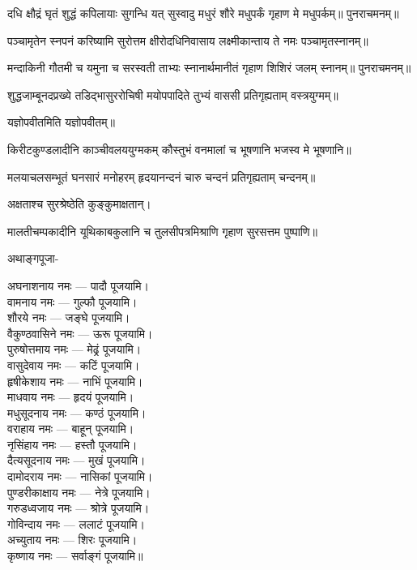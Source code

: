 \twolineshloka
{दधि क्षौद्रं घृतं शुद्धं कपिलायाः सुगन्धि यत्}
{सुस्वादु मधुरं शौरे मधुपर्कं गृहाण मे}
मधुपर्कम्॥
पुनराचमनम्॥

\twolineshloka
{पञ्चामृतेन स्नपनं करिष्यामि सुरोत्तम}
{क्षीरोदधिनिवासाय लक्ष्मीकान्ताय ते नमः}
पञ्चामृतस्नानम्॥

\twolineshloka
{मन्दाकिनी गौतमी च यमुना च सरस्वती}
{ताभ्यः स्नानार्थमानीतं गृहाण शिशिरं जलम्}
स्नानम्॥
पुनराचमनम्॥

\twolineshloka
{शुद्धजाम्बूनदप्रख्ये तडिद्भासुररोचिषी}
{मयोपपादिते तुभ्यं वाससी प्रतिगृह्यताम्}
वस्त्रयुग्मम्॥

यज्ञोपवीतमिति यज्ञोपवीतम्॥

\twolineshloka
{किरीटकुण्डलादीनि काञ्चीवलययुग्मकम्}
{कौस्तुभं वनमालां च भूषणानि भजस्व मे}
भूषणानि॥

\twolineshloka
{मलयाचलसम्भूतं घनसारं मनोहरम्}
{हृदयानन्दनं चारु चन्दनं प्रतिगृह्यताम्}
चन्दनम्॥

अक्षताश्च सुरश्रेष्ठेति कुङ्कुमाक्षतान्।

\twolineshloka
{मालतीचम्पकादीनि यूथिकाबकुलानि च}
{तुलसीपत्रमिश्राणि गृहाण सुरसत्तम}
पुष्पाणि॥


अथाङ्गपूजा-

अघनाशनाय नमः — पादौ पूजयामि।\\
वामनाय नमः — गुल्फौ पूजयामि।\\
शौरये नमः — जङ्घे पूजयामि।\\
वैकुण्ठवासिने नमः — ऊरू पूजयामि।\\
पुरुषोत्तमाय नमः — मेढ्रं पूजयामि।\\
वासुदेवाय नमः — कटिं पूजयामि।\\
हृषीकेशाय नमः — नाभिं पूजयामि।\\
माधवाय नमः — हृदयं पूजयामि।\\
मधुसूदनाय नमः — कण्ठं पूजयामि।\\
वराहाय नमः — बाहून् पूजयामि।\\
नृसिंहाय नमः — हस्तौ पूजयामि।\\
दैत्यसूदनाय नमः — मुखं पूजयामि।\\
दामोदराय नमः — नासिकां पूजयामि।\\
पुण्डरीकाक्षाय नमः — नेत्रे पूजयामि।\\
गरुडध्वजाय नमः — श्रोत्रे पूजयामि।\\
गोविन्दाय नमः — ललाटं पूजयामि।\\
अच्युताय नमः — शिरः पूजयामि।\\
कृष्णाय नमः — सर्वाङ्गं पूजयामि॥\\


